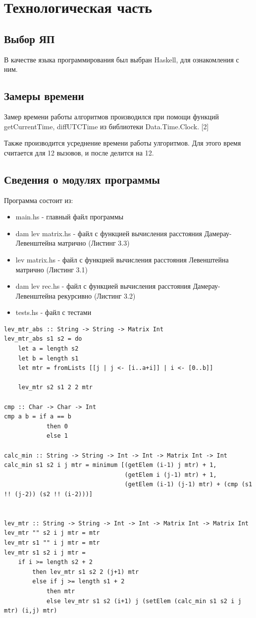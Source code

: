 \documentclass[12pt]{report}
\begin{document}
\chapter{Технологическая часть}
\section{Выбор ЯП}
В качестве языка программирования был выбран Haskell, для ознакомления с ним.

\section{Замеры времени}
Замер времени работы алгоритмов производился при помощи функций getCurrentTime, diffUTCTime из библиотеки Data.Time.Clock. [2]

Также производится усреднение времени работы улгоритмов. Для этого время считается для 12 вызовов, и после делится на 12.

\section{Сведения о модулях программы}
Программа состоит из:
\begin{itemize}
	\item main.hs - главный файл программы
	\item dam lev matrix.hs - файл с функцией вычисления расстояния Дамерау-Левенштейна матрично (Листинг 3.3)
	\item lev matrix.hs - файл с функцией вычисления расстояния Левенштейна матрично (Листинг 3.1)
	\item dam lev rec.hs - файл с функцией вычисления расстояния Дамерау-Левенштейна рекурсивно (Листинг 3.2)
	\item tests.hs - файл с тестами 
\end{itemize}

\begin{lstlisting}[label=some-code,caption=Функция нахождения расстояния Левенштейна матрично]
lev_mtr_abs :: String -> String -> Matrix Int
lev_mtr_abs s1 s2 = do
    let a = length s2
    let b = length s1
    let mtr = fromLists [[j | j <- [i..a+i]] | i <- [0..b]]
    
    lev_mtr s2 s1 2 2 mtr

cmp :: Char -> Char -> Int
cmp a b = if a == b
            then 0
            else 1

calc_min :: String -> String -> Int -> Int -> Matrix Int -> Int
calc_min s1 s2 i j mtr = minimum [(getElem (i-1) j mtr) + 1, 
                                  (getElem i (j-1) mtr) + 1,
                                  (getElem (i-1) (j-1) mtr) + (cmp (s1 !! (j-2)) (s2 !! (i-2)))]

                                
lev_mtr :: String -> String -> Int -> Int -> Matrix Int -> Matrix Int
lev_mtr "" s2 i j mtr = mtr
lev_mtr s1 "" i j mtr = mtr
lev_mtr s1 s2 i j mtr = 
    if i >= length s2 + 2
        then lev_mtr s1 s2 2 (j+1) mtr
        else if j >= length s1 + 2
            then mtr
            else lev_mtr s1 s2 (i+1) j (setElem (calc_min s1 s2 i j mtr) (i,j) mtr)
\end{lstlisting}
\end{document}
